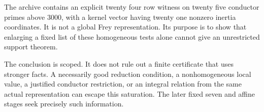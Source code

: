 The archive contains an explicit twenty four row witness on twenty five conductor primes above 3000, with a kernel vector having twenty one nonzero inertia coordinates. It is not a global Frey representation. Its purpose is to show that enlarging a fixed list of these homogeneous tests alone cannot give an unrestricted support theorem.

The conclusion is scoped. It does not rule out a finite certificate that uses stronger facts. A necessarily good reduction condition, a nonhomogeneous local value, a justified conductor restriction, or an integral relation from the same actual representation can escape this saturation. The later fixed seven and affine stages seek precisely such information.
